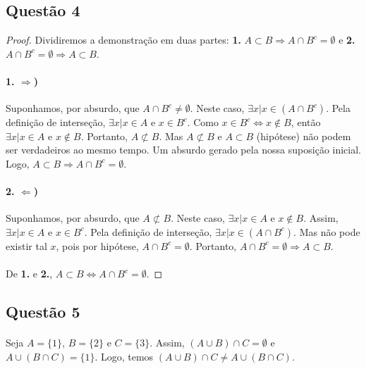\documentclass[9pt,twocolumn,a4paper]{article}
\begin{document}
    \subsection{Questão 4}
    \begin{proof}
    Dividiremos a demonstração em duas partes: \textbf{1.} $A \subset B \Rightarrow A \cap B^c = \emptyset$ e \textbf{2.} $A \cap B^c = \emptyset \Rightarrow A \subset B$.

    \paragraph{1. $\Rightarrow$)}
    Suponhamos, por absurdo, que $A \cap B^c \not= \emptyset$. Neste caso, $\exists x | x \in (A \cap B^c)$. Pela definição de interseção, $\exists x | x \in A $ e $x \in B^c$. Como $x \in B^c \Leftrightarrow x \not\in B$, então $\exists x | x \in A $ e $x \not\in B$. Portanto, $A \not\subset B$. Mas $A \not\subset B$ e $A \subset B$ (hipótese) não podem ser verdadeiros ao mesmo tempo. Um absurdo gerado pela nossa suposição inicial. Logo, $A \subset B \Rightarrow A \cap B^c = \emptyset$.

    \paragraph{2. $\Leftarrow$)}
    Suponhamos, por absurdo, que $A \not\subset B$. Neste caso, $\exists x | x \in A $ e $x \not\in B$. Assim, $\exists x | x \in A$ e $x \in B^c$. Pela definição de interseção, $\exists x | x \in (A \cap B^c)$. Mas não pode existir tal $x$, pois por hipótese, $A \cap B^c = \emptyset$. Portanto, $A \cap B^c = \emptyset \Rightarrow A \subset B$.
    
    \paragraph{}
    De \textbf{1.} e \textbf{2.}, $A \subset B \Leftrightarrow A \cap B^c = \emptyset$.
    \end{proof}


    \subsection{Questão 5}
    \paragraph{}
    Seja $A = \{1\}$, $B = \{2\}$ e $C = \{3\}$. Assim, $(A \cup B) \cap C = \emptyset$ e $A \cup(B \cap C) = \{1\}$. Logo, temos $(A \cup B) \cap C \not= A \cup (B \cap C)$.
\end{document}
